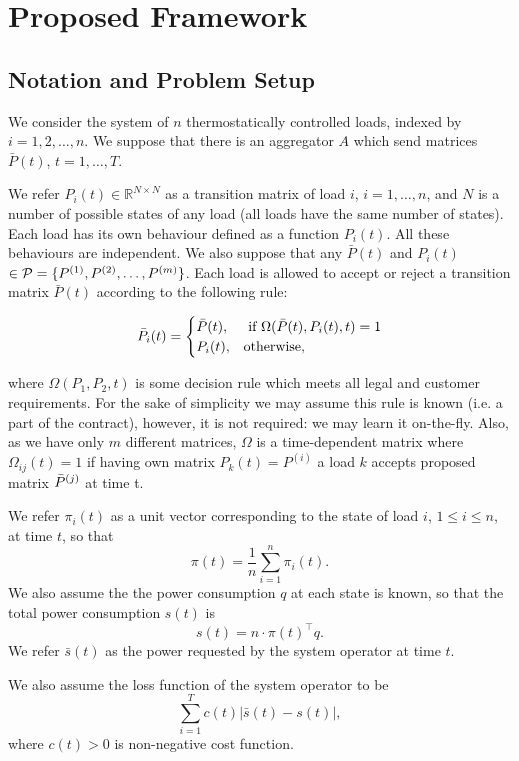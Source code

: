\chapter{Proposed Framework}
\section{Notation and Problem Setup} We consider the system of $n$ thermostatically controlled loads, indexed by $i = 1, 2, \dots, n$. We suppose that there is an aggregator $A$ which send matrices ${\bar P}(t)$, $t=1, \dots, T$.

We refer $P_i(t) \in \mathbb{R}^{N\times N}$ as a transition matrix of load $i$, $i = 1, \dots, n$, and $N$ is a number of possible states of any load (all loads have the same number of states). Each load has its own behaviour defined as a function $P_i(t)$. All these behaviours are independent. We also suppose that any ${\bar P}(t)$ and $P_{i}(t)$  $\in {\cal P} = \{P^{(1)}, P^{(2)}, \dots, P^{(m)}\}$. Each load is allowed to accept or reject a transition matrix ${\bar P}(t)$ according to the following rule: 


\[
    {\bar P_i}(t) = 
    \begin{cases}
    {\bar P}(t), & \text{ if } \Omega({\bar P}(t),P_{i}(t), t) = 1\\
    P_i(t), & \text{otherwise},
    \end{cases}
\]

where $\Omega(P_1, P_2, t)$ is some decision rule which meets all legal and customer requirements. For the sake of simplicity we may assume this rule is known (i.e. a part of the contract), however, it is not required: we may learn it on-the-fly. Also, as we have only $m$ different matrices, $\Omega$ is a time-dependent matrix where $\Omega_{ij}(t) = 1$ if having own matrix $P_k(t) = P^{(i)}$ a load $k$ accepts proposed matrix ${\bar P}^{(j)}$ at time t. 


%
We refer $\pi_i(t)$ as a unit vector corresponding to the state of load $i$, $1\le i \le n$, at time $t$, so that 
\[\pi(t) = \frac{1}{n}\sum_{i=1}^n \pi_i(t).\]
We also assume the the power consumption $q$ at each state is known, so that the total power consumption $s(t)$ is 
\[s(t) = n\cdot \pi(t)^\top q.\]
We refer ${\bar s}(t)$ as the power requested by the system operator at time $t$. 

We also assume the loss function of the system operator to be 
\[
\sum_{i=1}^T c(t) |{\bar s}(t) - s(t)|, 
\]
where $c(t) > 0$  is non-negative cost function. 



